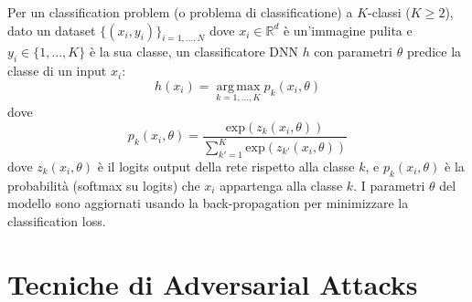         Per un classification problem (o problema di classificatione) a $K$-classi ($K \geq 2$), dato un dataset $\{(x_i, y_i)\}_{i=1,...,N}$ dove $x_i \in \mathbb{R}^d$ è un'immagine pulita e $y_i \in \{1, ... , K\}$ è la sua classe, un classificatore DNN $h$ con parametri $\theta$ predice la classe di un input $x_i$:
            \begin{equation}
                h(x_i) = \operatorname*{arg\,max}_{k = 1, ..., K}p_k(x_i, \theta)
            \end{equation}
        dove
            \begin{equation}
                p_k(x_i, \theta) = \frac{\text{exp}(z_k(x_i, \theta))}{\sum_{k'=1}^{K}\text{exp}(z_{k'}(x_i, \theta))}
            \end{equation}
        dove $z_k(x_i, \theta)$ è il logits output della rete rispetto alla classe $k$, e $p_k(x_i, \theta)$ è la probabilità (softmax su logits) che $x_i$ appartenga alla classe $k$. I parametri $\theta$ del modello sono aggiornati usando la back-propagation per minimizzare la classification loss.
\newpage
\section{Tecniche di Adversarial Attacks}
\label{Tecniche di Adversarial Attacks}

